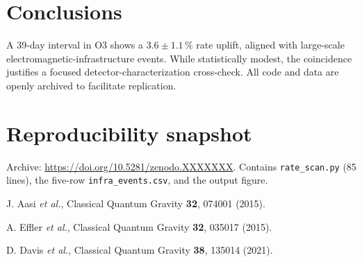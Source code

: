 \documentclass[
  reprint,
  nofootinbib,
  amsmath,amssymb,
  aps,prd,
  superscriptaddress
]{revtex4-2}
\begin{document}
\section{Conclusions}
A 39-day interval in O3 shows a \(3.6 \pm 1.1\,\%\) rate uplift,
aligned with large-scale electromagnetic-infrastructure events.
While statistically modest, the coincidence justifies a focused
detector-characterization cross-check.  All code and data are openly
archived to facilitate replication.

\appendix
\section{Reproducibility snapshot}
Archive: \url{https://doi.org/10.5281/zenodo.XXXXXXX}.  
Contains \texttt{rate\_scan.py} (85 lines), the five-row
\texttt{infra\_events.csv}, and the output figure.

\begin{thebibliography}{9}

J. Aasi \textit{et al.},
Classical Quantum Gravity \textbf{32}, 074001 (2015).

A. Effler \textit{et al.},
Classical Quantum Gravity \textbf{32}, 035017 (2015).

D. Davis \textit{et al.},
Classical Quantum Gravity \textbf{38}, 135014 (2021).

\end{thebibliography}
\end{document}
